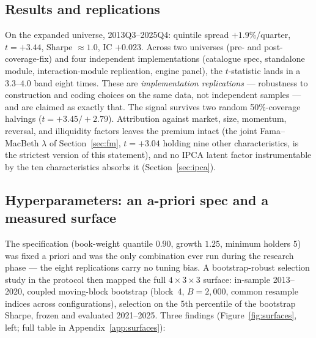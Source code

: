 \subsection{Results and replications}

On the expanded universe, 2013Q3--2025Q4: quintile spread
$+1.9\%$/quarter, $t=+3.44$, Sharpe $\approx 1.0$, IC $+0.023$.
Across two universes (pre- and post-coverage-fix) and four
independent implementations (catalogue spec, standalone module,
interaction-module replication, engine panel), the $t$-statistic
lands in a $3.3$--$4.0$ band eight times. These are
\emph{implementation replications} --- robustness to construction
and coding choices on the same data, not independent samples --- and
are claimed as exactly that. The signal survives two random
50\%-coverage halvings ($t=+3.45/+2.79$). Attribution
against market, size, momentum, reversal, and illiquidity factors
leaves the premium intact (the joint Fama--MacBeth $\lambda$ of
Section~\ref{sec:fm}, $t=+3.04$ holding nine other characteristics,
is the strictest version of this statement), and no IPCA latent
factor instrumentable by the ten characteristics absorbs it
(Section~\ref{sec:ipca}).

\subsection{Hyperparameters: an a-priori spec and a measured surface}
\label{sec:ncb-surface}

The specification (book-weight quantile $0.90$, growth $1.25$,
minimum holders $5$) was fixed a priori and was the only combination
ever run during the research phase --- the eight replications carry
no tuning bias. A bootstrap-robust selection study in the
\citet{oliveira2025} protocol then mapped the full $4\times3\times3$
surface: in-sample 2013--2020, coupled moving-block bootstrap
(block~4, $B=2{,}000$, common resample indices across configurations),
selection on the 5th percentile of the bootstrap Sharpe, frozen and
evaluated 2021--2025. Three findings
(Figure~\ref{fig:surfaces}, left; full table in
Appendix~\ref{app:surfaces}):


